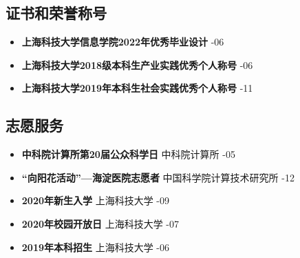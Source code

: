 \documentclass[a4paper,10pt]{ctexart} %
\begin{document}

\begin{keepsection}

\section{证书和荣誉称号}
\begin{itemize}
    \item \textbf{上海科技大学信息学院2022年优秀毕业设计} \hfill {}-06
    \item \textbf{上海科技大学2018级本科生产业实践优秀个人称号} \hfill {}-06
    \item \textbf{上海科技大学2019年本科生社会实践优秀个人称号} \hfill {}-11
\end{itemize}

\end{keepsection}



\begin{keepsection}

\section{志愿服务}
\begin{itemize}
    \item \textbf{中科院计算所第20届公众科学日}  \hfill 中科院计算所 -05
    \item \textbf{“向阳花活动”—海淀医院志愿者}  \hfill 中国科学院计算技术研究所 -12
    \item \textbf{2020年新生入学}  \hfill 上海科技大学 -09
    \item \textbf{2020年校园开放日}  \hfill 上海科技大学 -07
    \item \textbf{2019年本科招生}  \hfill 上海科技大学 -06
\end{itemize}

\end{keepsection}
\end{document}
